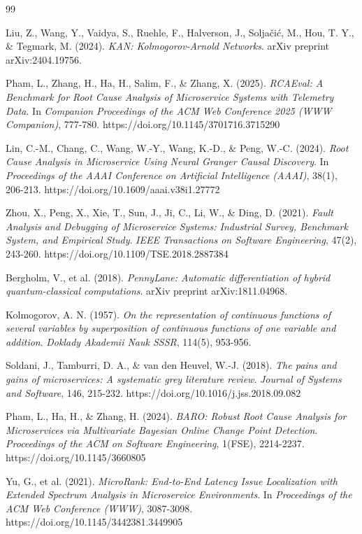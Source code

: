 \documentclass[conference]{IEEEtran}
\begin{document}
\begin{thebibliography}{99}
\small

Liu, Z., Wang, Y., Vaidya, S., Ruehle, F., Halverson, J., Soljačić, M., Hou, T. Y., \& Tegmark, M. (2024).
\textit{KAN: Kolmogorov-Arnold Networks}.
arXiv preprint arXiv:2404.19756.

Pham, L., Zhang, H., Ha, H., Salim, F., \& Zhang, X. (2025).
\textit{RCAEval: A Benchmark for Root Cause Analysis of Microservice Systems with Telemetry Data}.
In \textit{Companion Proceedings of the ACM Web Conference 2025 (WWW Companion)}, 777-780.
https://doi.org/10.1145/3701716.3715290

Lin, C.-M., Chang, C., Wang, W.-Y., Wang, K.-D., \& Peng, W.-C. (2024).
\textit{Root Cause Analysis in Microservice Using Neural Granger Causal Discovery}.
In \textit{Proceedings of the AAAI Conference on Artificial Intelligence (AAAI)}, 38(1), 206-213.
https://doi.org/10.1609/aaai.v38i1.27772

Zhou, X., Peng, X., Xie, T., Sun, J., Ji, C., Li, W., \& Ding, D. (2021).
\textit{Fault Analysis and Debugging of Microservice Systems: Industrial Survey, Benchmark System, and Empirical Study}.
\textit{IEEE Transactions on Software Engineering}, 47(2), 243-260.
https://doi.org/10.1109/TSE.2018.2887384

Bergholm, V., et al. (2018).
\textit{PennyLane: Automatic differentiation of hybrid quantum-classical computations}.
arXiv preprint arXiv:1811.04968.

Kolmogorov, A. N. (1957).
\textit{On the representation of continuous functions of several variables by superposition of continuous functions of one variable and addition}.
\textit{Doklady Akademii Nauk SSSR}, 114(5), 953-956.

Soldani, J., Tamburri, D. A., \& van den Heuvel, W.-J. (2018).
\textit{The pains and gains of microservices: A systematic grey literature review}.
\textit{Journal of Systems and Software}, 146, 215-232.
https://doi.org/10.1016/j.jss.2018.09.082

Pham, L., Ha, H., \& Zhang, H. (2024).
\textit{BARO: Robust Root Cause Analysis for Microservices via Multivariate Bayesian Online Change Point Detection}.
\textit{Proceedings of the ACM on Software Engineering}, 1(FSE), 2214-2237.
https://doi.org/10.1145/3660805

Yu, G., et al. (2021).
\textit{MicroRank: End-to-End Latency Issue Localization with Extended Spectrum Analysis in Microservice Environments}.
In \textit{Proceedings of the ACM Web Conference (WWW)}, 3087-3098.
https://doi.org/10.1145/3442381.3449905


\end{thebibliography}
\end{document}
